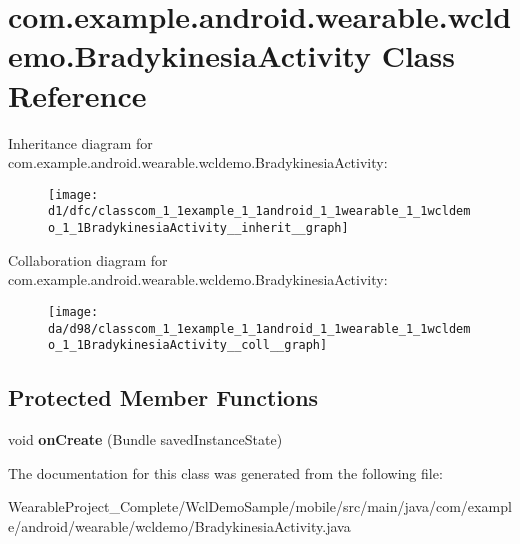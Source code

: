 \hypertarget{classcom_1_1example_1_1android_1_1wearable_1_1wcldemo_1_1BradykinesiaActivity}{}\section{com.\+example.\+android.\+wearable.\+wcldemo.\+Bradykinesia\+Activity Class Reference}
\label{classcom_1_1example_1_1android_1_1wearable_1_1wcldemo_1_1BradykinesiaActivity}


Inheritance diagram for com.\+example.\+android.\+wearable.\+wcldemo.\+Bradykinesia\+Activity\+:\nopagebreak
\begin{figure}[H]
\begin{center}
\leavevmode
\texttt{[image: d1/dfc/classcom\_1\_1example\_1\_1android\_1\_1wearable\_1\_1wcldemo\_1\_1BradykinesiaActivity\_\_inherit\_\_graph]}
\end{center}
\end{figure}


Collaboration diagram for com.\+example.\+android.\+wearable.\+wcldemo.\+Bradykinesia\+Activity\+:\nopagebreak
\begin{figure}[H]
\begin{center}
\leavevmode
\texttt{[image: da/d98/classcom\_1\_1example\_1\_1android\_1\_1wearable\_1\_1wcldemo\_1\_1BradykinesiaActivity\_\_coll\_\_graph]}
\end{center}
\end{figure}
\subsection*{Protected Member Functions}
\begin{DoxyCompactItemize}
\item 
void {\bfseries on\+Create} (Bundle saved\+Instance\+State)\hypertarget{classcom_1_1example_1_1android_1_1wearable_1_1wcldemo_1_1BradykinesiaActivity_a4302240214033e7df45e3c2d57bd8098}{}\label{classcom_1_1example_1_1android_1_1wearable_1_1wcldemo_1_1BradykinesiaActivity_a4302240214033e7df45e3c2d57bd8098}

\end{DoxyCompactItemize}


The documentation for this class was generated from the following file\+:\begin{DoxyCompactItemize}
\item 
Wearable\+Project\+\_\+\+Complete/\+Wcl\+Demo\+Sample/mobile/src/main/java/com/example/android/wearable/wcldemo/Bradykinesia\+Activity.\+java\end{DoxyCompactItemize}
